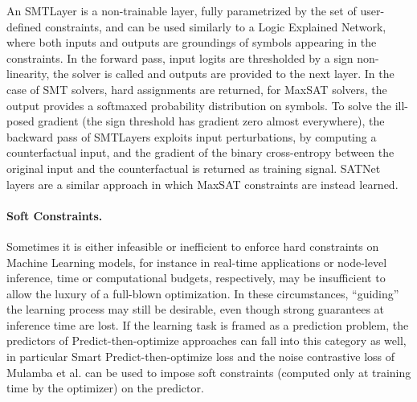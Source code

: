 An SMTLayer is a non-trainable layer, fully parametrized by the set of user-defined constraints, and can be used similarly to a Logic Explained Network, where both inputs and outputs are groundings of symbols appearing in the constraints.
In the forward pass, input logits are thresholded by a sign non-linearity, the solver is called and outputs are provided to the next layer. In the case of SMT solvers, hard assignments are returned, for MaxSAT solvers, the output provides a softmaxed probability distribution on symbols.
To solve the ill-posed gradient (the sign threshold has gradient zero almost everywhere), the backward pass of SMTLayers exploits input perturbations, by computing a counterfactual input, and the gradient of the binary cross-entropy between the original input and the counterfactual is returned as training signal.
SATNet~\cite{wang2019satnet} layers are a similar approach in which MaxSAT constraints are instead learned.

\paragraph{Soft Constraints.}
Sometimes it is either infeasible or inefficient to enforce hard constraints on Machine Learning models, for instance in real-time applications or node-level inference, time or computational budgets, respectively, may be insufficient to allow the luxury of a full-blown optimization. In these circumstances, ``guiding'' the learning process may still be desirable, even though strong guarantees at inference time are lost. %
%
If the learning task is framed as a prediction problem, the predictors of Predict-then-optimize approaches can fall into this category as well, in particular Smart Predict-then-optimize loss and the noise contrastive loss of Mulamba et al. can be used to impose soft constraints (computed only at training time by the optimizer) on the predictor.

